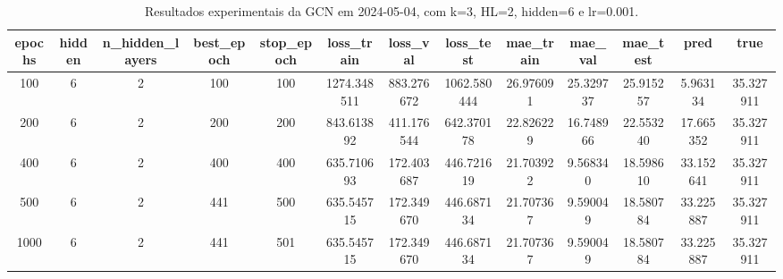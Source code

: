 \begin{table}[h]
\centering
\caption{Resultados experimentais da GCN em 2024-05-04, com k=3, HL=2, hidden=6 e lr=0.001.}
\label{tab:gcn_results_k3_hl2_h6_d20240504}
\begin{tabular}{ccccccccccccc}
\toprule
epochs & hidden & n\_hidden\_layers & best\_epoch & stop\_epoch & loss\_train & loss\_val & loss\_test & mae\_train & mae\_val & mae\_test & pred & true \\
\midrule
100 & 6 & 2 & 100 & 100 & 1274.348511 & 883.276672 & 1062.580444 & 26.976091 & 25.329737 & 25.915257 & 5.963134 & 35.327911 \\
200 & 6 & 2 & 200 & 200 & 843.613892 & 411.176544 & 642.370178 & 22.826229 & 16.748966 & 22.553240 & 17.665352 & 35.327911 \\
400 & 6 & 2 & 400 & 400 & 635.710693 & 172.403687 & 446.721619 & 21.703922 & 9.568340 & 18.598610 & 33.152641 & 35.327911 \\
500 & 6 & 2 & 441 & 500 & 635.545715 & 172.349670 & 446.687134 & 21.707367 & 9.590049 & 18.580784 & 33.225887 & 35.327911 \\
1000 & 6 & 2 & 441 & 501 & 635.545715 & 172.349670 & 446.687134 & 21.707367 & 9.590049 & 18.580784 & 33.225887 & 35.327911 \\
\bottomrule
\end{tabular}
\end{table}
